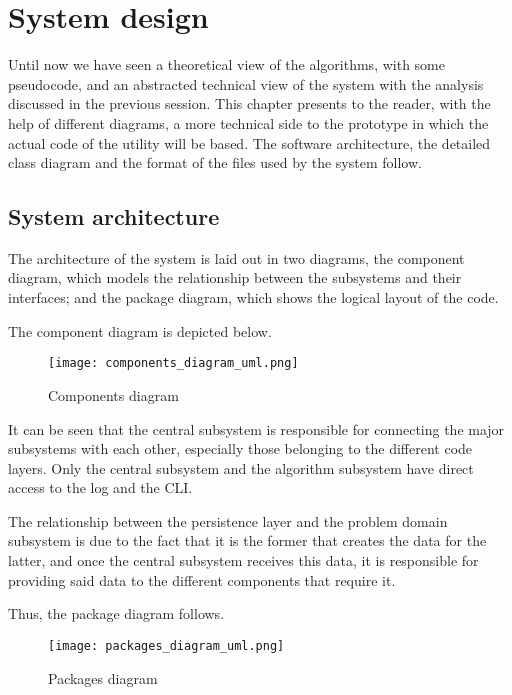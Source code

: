 \renewcommand{\documentname}{System design}

\chapter{System design}


Until now we have seen a theoretical view of the algorithms, with some pseudocode, and an abstracted technical view of the system with the analysis discussed in the previous session. This chapter presents to the reader, with the help of different diagrams, a more technical side to the prototype in which the actual code of the utility will be based. The software architecture, the detailed class diagram and the format of the files used by the system follow.


\section{System architecture}

The architecture of the system is laid out in two diagrams, the component diagram, which models the relationship between the subsystems and their interfaces; and the package diagram, which shows the logical layout of the code.

The component diagram is depicted below.


\begin{figure}[H]
    \caption{Components diagram}
  \centering
  \texttt{[image: components\_diagram\_uml.png]}
\end{figure}

It can be seen that the central subsystem is responsible for connecting the major subsystems with each other, especially those belonging to the different code layers. Only the central subsystem and the algorithm subsystem have direct access to the log and the CLI.

The relationship between the persistence layer and the problem domain subsystem is due to the fact that it is the former that creates the data for the latter, and once the central subsystem receives this data, it is responsible for providing said data to the different components that require it.

Thus, the package diagram follows.

\begin{figure}[H]
    \caption{Packages diagram}
  \centering
  \texttt{[image: packages\_diagram\_uml.png]}
\end{figure}


